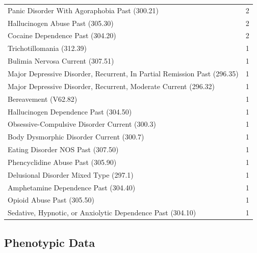 \begin{table}[h!]
\begin{tabular}{ lr }
        Panic Disorder With Agoraphobia Past (300.21)  & 2 \\
        Hallucinogen Abuse Past (305.30)  &  2 \\
        Cocaine Dependence Past (304.20)  &  2 \\
        Trichotillomania (312.39)  & 1 \\
        Bulimia Nervosa Current (307.51)  &  1 \\
        Major Depressive Disorder, Recurrent, In Partial Remission Past (296.35)  &  1 \\
        Major Depressive Disorder, Recurrent, Moderate Current (296.32)  & 1 \\
        Bereavement (V62.82)    & 1 \\
        Hallucinogen Dependence Past (304.50)  & 1 \\
        Obsessive-Compulsive Disorder Current (300.3) &  1 \\
        Body Dysmorphic Disorder Current (300.7)  &  1 \\
        Eating Disorder NOS Past (307.50) &  1 \\
        Phencyclidine Abuse Past (305.90) &  1 \\
        Delusional Disorder Mixed Type (297.1) &  1 \\
        Amphetamine Dependence Past (304.40)  &  1 \\
        Opioid Abuse Past (305.50) & 1 \\
        Sedative, Hypnotic, or Anxiolytic Dependence Past (304.10) &  1 \\
      \end{tabular}
\label{table:psych}
\end{table}

\subsection{Phenotypic Data}

